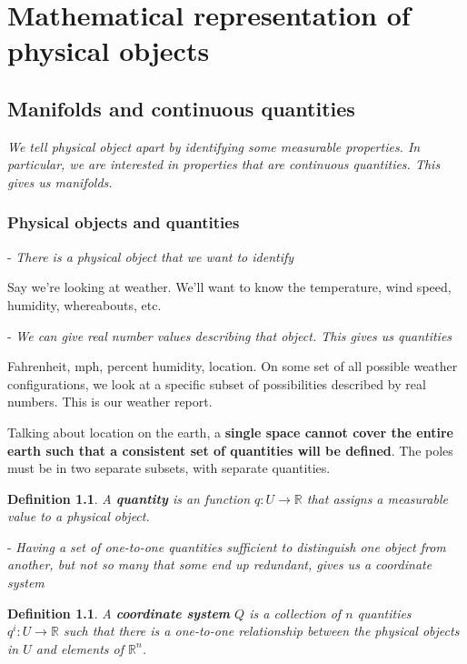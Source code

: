 \documentclass{book}
\newtheorem{defn}[equation]{Definition}
\begin{document}
\tableofcontents

\chapter{Mathematical representation of physical objects}



\section{Manifolds and continuous quantities}
\emph{We tell physical object apart by identifying some measurable properties. In particular, we are interested in properties that are continuous quantities. This gives us manifolds.}

\subsection{Physical objects and quantities}

- \emph{There is a physical object that we want to identify}

Say we're looking at weather. We'll want to know the temperature, wind speed, humidity, whereabouts, etc.

- \emph{We can give real number values describing that object. This gives us quantities}

Fahrenheit, mph, percent humidity, location.
On some set of all possible weather configurations, we look at a specific subset of possibilities described by real numbers. This is our weather report.  

Talking about location on the earth, a \textbf{single space cannot cover the entire earth such that a consistent set of quantities will be defined}. The poles must be in two separate subsets, with separate quantities. 

\begin{defn}
	A \textbf{quantity} is an function $q : U \to \mathbb{R}$ that assigns a measurable value to a physical object.
\end{defn}


- \emph{Having a set of one-to-one quantities sufficient to distinguish one object from another, but not so many that some end up redundant, gives us a coordinate system}


\begin{defn}
	A \textbf{coordinate system} $Q$ is a collection of $n$ quantities $q^i : U \to \mathbb{R}$ such that there is a one-to-one relationship between the physical objects in $U$ and elements of $\mathbb{R}^n$.
\end{defn}
\end{document}
